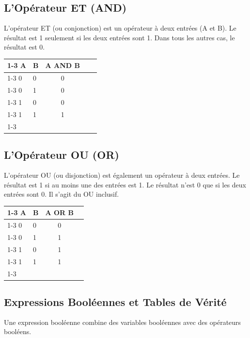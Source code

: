 \subsection{L'Opérateur ET (AND)}

L'opérateur ET (ou conjonction) est un opérateur à deux entrées (A et B). Le résultat est 1 seulement si les deux entrées sont 1. Dans tous les autres cas, le résultat est 0.

\begin{center}
\begin{tabular}{|l|l|c|ll}
\cline{1-3}
A & B & A AND B &  &  \\ \cline{1-3}
0 & 0 & 0       &  &  \\ \cline{1-3}
0 & 1 & 0       &  &  \\ \cline{1-3}
1 & 0 & 0       &  &  \\ \cline{1-3}
1 & 1 & 1       &  &  \\ \cline{1-3}
\end{tabular}
\end{center}

\subsection{L'Opérateur OU (OR)}

L'opérateur OU (ou disjonction) est également un opérateur à deux entrées. Le résultat est 1 si au moins une des entrées est 1. Le résultat n'est 0 que si les deux entrées sont 0. Il s'agit du OU inclusif.

\begin{center}
\begin{tabular}{|l|l|c|l}
\cline{1-3}
A & B & A OR B  \\ \cline{1-3}
0 & 0 & 0     \\ \cline{1-3}
0 & 1 & 1     \\ \cline{1-3}
1 & 0 & 1     \\ \cline{1-3}
1 & 1 & 1     \\ \cline{1-3}
\end{tabular}
\end{center}

\subsection{Expressions Booléennes et Tables de Vérité}

Une expression booléenne combine des variables booléennes avec des opérateurs booléens.

